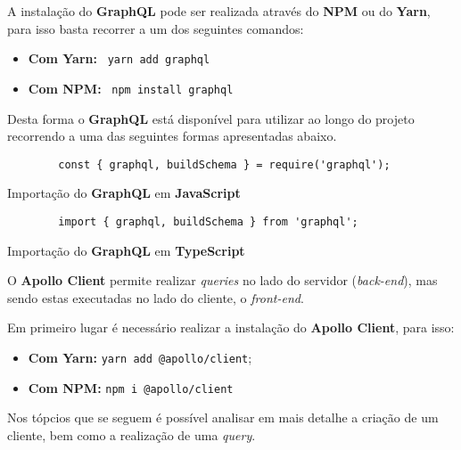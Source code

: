 \label{graphqlAttachments}


A instalação do \textbf{GraphQL} pode ser realizada através do \textbf{NPM} ou do \textbf{Yarn}, para isso basta recorrer a um dos seguintes comandos:

\begin{itemize}
	\item \textbf{Com Yarn:} ~\texttt{yarn add graphql}
	\item \textbf{Com NPM:} ~\texttt{npm install graphql}
\end{itemize}

Desta forma o \textbf{GraphQL} está disponível para utilizar ao longo do projeto recorrendo a uma das seguintes formas apresentadas abaixo.

\begin{longlisting}
	\begin{verbatim}
		const { graphql, buildSchema } = require('graphql');
	\end{verbatim}

	\caption{Importação do \textbf{GraphQL} em \textbf{JavaScript}}
\end{longlisting}

\begin{longlisting}
	\begin{verbatim}
		import { graphql, buildSchema } from 'graphql';
	\end{verbatim}

	\caption{Importação do \textbf{GraphQL} em \textbf{TypeScript}}
\end{longlisting}


O \textbf{Apollo Client} permite realizar \textit{queries} no lado do servidor (\textit{back-end}), mas sendo estas executadas no lado do cliente, o \textit{front-end}.

Em primeiro lugar é necessário realizar a instalação do \textbf{Apollo Client}, para isso:

\begin{itemize}
	\item \textbf{Com Yarn:} \verb|yarn add @apollo/client|;
	\item \textbf{Com NPM:} \verb|npm i @apollo/client|
\end{itemize}

Nos tópcios que se seguem é possível analisar em mais detalhe a criação de um cliente, bem como a realização de uma \textit{query}.

